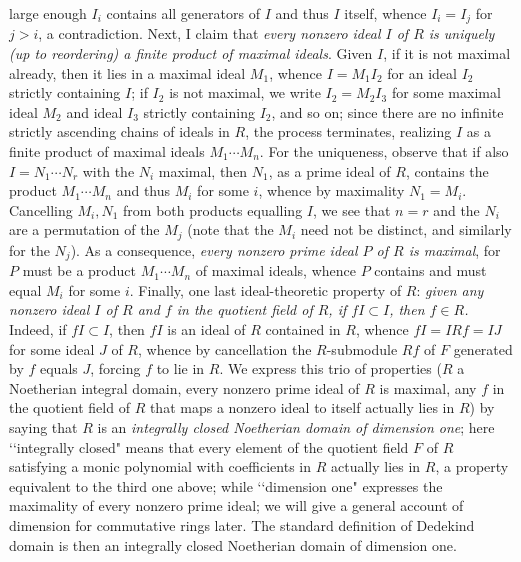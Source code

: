 \documentclass[10pt]{article}
\begin{document}
large enough $I_i$ contains all generators of $I$ and thus $I$ itself,
whence $I_i = I_j$ for $j>i$, a contradiction. Next, I claim that {\sl
  every nonzero ideal $I$ of $R$ is uniquely (up to reordering) a finite
  product of maximal ideals}. Given $I$, if it is not maximal already,
then it lies in a maximal ideal $M_1$, whence $I= M_1 I_2$ for an ideal
$I_2$ strictly containing $I$; if $I_2$ is not maximal, we write $I_2 =
M_2 I_3$ for some maximal ideal $M_2$ and ideal $I_3$ strictly
containing $I_2$, and so on; since there are no infinite strictly
ascending chains of ideals in $R$, the process terminates, realizing $I$
as a finite product of maximal ideals $M_1\cdots M_n$. For the
uniqueness, observe that if also $I = N_1\cdots N_r$ with the $N_i$
maximal, then $N_1$, as a prime ideal of $R$, contains the product
$M_1\cdots M_n$ and thus $M_i$ for some $i$, whence by maximality $N_1 =
M_i$. Cancelling $M_i, N_1$ from both products equalling $I$, we see
that $n=r$ and the $N_i$ are a permutation of the $M_j$ (note that the
$M_i$ need not be distinct, and similarly for the $N_j$). As a
consequence, {\sl every nonzero prime ideal $P$ of $R$ is maximal}, for
$P$ must be a product $M_1\cdots M_n$ of maximal ideals, whence $P$
contains and must equal $M_i$ for some $i$. Finally, one last
ideal-theoretic property of $R$: {\sl given any nonzero ideal $I$ of $R$
  and $f$ in the quotient field of $R$, if $fI\subset I$, then $f\in
  R$.} Indeed, if $fI\subset I$, then $fI$ is an ideal of $R$ contained
in $R$, whence $fI = IRf = IJ$ for some ideal $J$ of $R$, whence by
cancellation the $R$-submodule $Rf$ of $F$ generated by $f$ equals $J$,
forcing $f$ to lie in $R$. We express this trio of properties ($R$ a
Noetherian integral domain, every nonzero prime ideal of $R$ is maximal,
any $f$ in the quotient field of $R$ that maps a nonzero ideal to itself
actually lies in $R$) by saying that $R$ is an {\sl integrally closed
  Noetherian domain of dimension one}; here \lq\lq integrally closed"
means that every element of the quotient field $F$ of $R$ satisfying a
monic polynomial with coefficients in $R$ actually lies in $R$, a
property equivalent to the third one above; while \lq\lq dimension one"
expresses the maximality of every nonzero prime ideal; we will give a
general account of dimension for commutative rings later. The standard
definition of Dedekind domain is then an integrally closed Noetherian
domain of dimension one.
\end{document}
